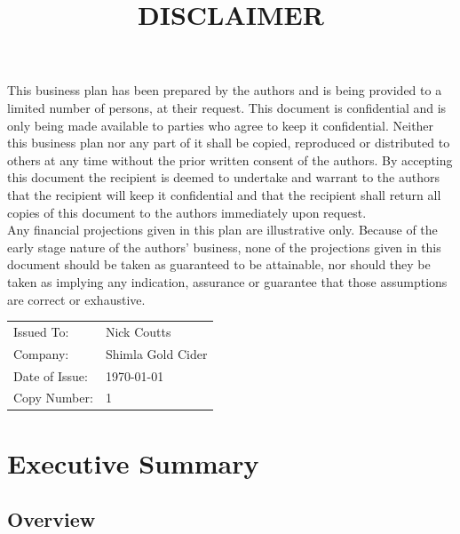 \documentclass[11pt]{article}
\begin{document}
\title{DISCLAIMER}
\maketitle

\noindent This business plan has been prepared by the authors and is being provided to a limited number of persons, at their request. This document is confidential and is only being made available to parties who agree to keep it confidential. Neither this business plan nor any part of it shall be copied, reproduced or distributed to others at any time without the prior written consent of the authors. By accepting this document the recipient is deemed to undertake and warrant to the authors that the recipient will keep it confidential and that the recipient shall return all copies of this document to the authors immediately upon request. \\

\noindent Any financial projections given in this plan are illustrative only. Because of the early stage nature of the authors’ business, none of the projections given in this document should be taken as guaranteed to be attainable, nor should they be taken as implying any indication, assurance or guarantee that those assumptions are correct or exhaustive.
\vfill
\begin{table}[H]
\begin{center}
\begin{tabular}{| l l |}
\hline
Issued To:      &  Nick Coutts        \\
Company:        &  Shimla Gold Cider  \\
Date of Issue:  &  \today             \\
Copy Number:    &  1                  \\
\hline
\end{tabular}
\end{center}
\end{table}

\newpage
\tableofcontents

\newpage
\section{Executive Summary}
  \subsection{Overview}
\end{document}

